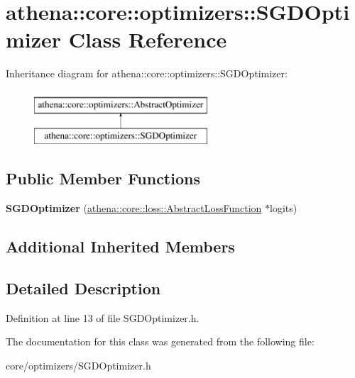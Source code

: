 \hypertarget{classathena_1_1core_1_1optimizers_1_1_s_g_d_optimizer}{}\section{athena\+:\+:core\+:\+:optimizers\+:\+:S\+G\+D\+Optimizer Class Reference}
\label{classathena_1_1core_1_1optimizers_1_1_s_g_d_optimizer}
Inheritance diagram for athena\+:\+:core\+:\+:optimizers\+:\+:S\+G\+D\+Optimizer\+:\begin{figure}[H]
\begin{center}
\leavevmode
\includegraphics[height=2.000000cm]{d2/db8/classathena_1_1core_1_1optimizers_1_1_s_g_d_optimizer}
\end{center}
\end{figure}
\subsection*{Public Member Functions}
\begin{DoxyCompactItemize}
\item 
\mbox{\label{classathena_1_1core_1_1optimizers_1_1_s_g_d_optimizer_a7b49822dc95f2e603d1f96b9a3ea529c}} 
{\bfseries S\+G\+D\+Optimizer} (\mbox{\hyperlink{classathena_1_1core_1_1loss_1_1_abstract_loss_function}{athena\+::core\+::loss\+::\+Abstract\+Loss\+Function}} $\ast$logits)
\end{DoxyCompactItemize}
\subsection*{Additional Inherited Members}


\subsection{Detailed Description}


Definition at line 13 of file S\+G\+D\+Optimizer.\+h.



The documentation for this class was generated from the following file\+:\begin{DoxyCompactItemize}
\item 
core/optimizers/S\+G\+D\+Optimizer.\+h\end{DoxyCompactItemize}
